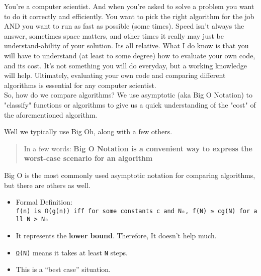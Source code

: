\newpage
\hypertarget{scary-big-o-notation}{%
	\label{scary-big-o-notation}}

You're a computer scientist. And when you're asked to solve a problem you want to do it correctly and efficiently. You want to pick the right algorithm for the job AND you want to run as fast as possible (some times). Speed isn't always the answer, sometimes space matters, and other times it really may just be understand-ability of your solution. Its all relative. What I do know is that you will have to understand (at least to some degree) how to evaluate your own code, and its cost. It's not something you will do everyday, but a working knowledge will help. Ultimately, evaluating your own code and comparing different algorithms is essential for any computer scientist.\\

So, how do we compare algorithms? We use \gls{asymptotic} (aka Big O Notation) to "classify" functions or algorithms to give us a quick understanding of the "cost" of the aforementioned algorithm.

Well we typically use Big Oh, along with a few others.

\begin{quote}
	In a few words: \textbf{Big O Notation is a convenient way to express the worst-case scenario for an algorithm}
\end{quote}

Big O is the most commonly used asymptotic notation for comparing algorithms, but there are others as well.

\hypertarget{related-asymptotic-notations}{%
	\label{related-asymptotic-notations}}
		
\hypertarget{big-omega-ux3c9}{%
	\label{big-omega-ux3c9}}

\begin{itemize}
	\tightlist
	\item
	      Formal Definition:
	      \texttt{f(n)\ is\ Ω(g(n))\ iff\ for\ some\ constants\ c\ and\ N₀,\ f(N)\ ≥\ cg(N)\ for\ all\ N\ \textgreater{}\ N₀}
	\item
	      It represents the \textbf{lower bound}. Therefore, It doesn't help
	      much.
	\item
	      \texttt{Ω(N)} means it takes at least \texttt{N} steps.
	\item
	      This is a ``best case'' situation.
\end{itemize}

